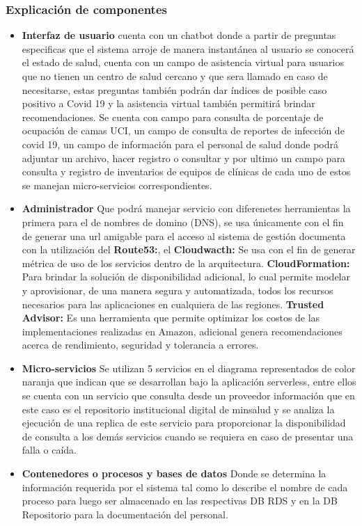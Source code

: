 \documentclass{article}
\begin{document}
\subsubsection{Explicación de componentes}

\begin{itemize}
    \item \textbf{Interfaz de usuario} cuenta con un chatbot donde a partir de preguntas especificas que el sistema arroje de manera instantánea al usuario se conocerá el estado de salud, cuenta con un campo de asistencia virtual para usuarios que no tienen un centro de salud cercano y que sera llamado en caso de necesitarse, estas preguntas también podrán dar índices de posible caso positivo a Covid 19 y la asistencia virtual también permitirá brindar recomendaciones. Se cuenta con campo para consulta de porcentaje de ocupación de camas UCI, un campo de consulta de reportes de infección  de covid 19, un campo de información para el personal de salud donde podrá adjuntar un archivo, hacer registro o consultar  y por ultimo un campo para consulta y registro de inventarios de equipos de clínicas de cada uno de estos se manejan micro-servicios correspondientes.
    
     \item \textbf{Administrador} Que podrá manejar servicio con diferenetes herramientas la primera para el de nombres de domino (DNS), se usa únicamente con el fin de generar una url amigable para el acceso al sistema de gestión documenta con la utilización del \textbf{Route53:}, el \textbf{Cloudwacth:} Se usa con el fin de generar métrica de uso de los servicios dentro de la arquitectura. \textbf{CloudFormation:} Para brindar la solución de disponibilidad adicional, lo cual permite modelar y aprovisionar, de una manera segura y automatizada, todos los recursos necesarios para las aplicaciones en cualquiera de las regiones. \textbf{Trusted Advisor:} Es una herramienta que permite optimizar los costos de las implementaciones realizadas en Amazon, adicional genera recomendaciones acerca de rendimiento, seguridad y tolerancia a errores.
     
    \item \textbf{Micro-servicios} Se utilizan 5 servicios en el diagrama representados de color naranja que indican que se desarrollan bajo la aplicación serverless, entre ellos se cuenta con un servicio que consulta desde un proveedor información que en este caso es el repositorio institucional digital de minsalud y se analiza la ejecución de una replica de este servicio para proporcionar la disponibilidad de consulta a los demás servicios cuando se requiera en caso de presentar una falla o caída.
    \item \textbf{Contenedores o procesos y bases de datos} Donde se determina la información requerida  por el sistema tal como lo describe el nombre de cada proceso para luego ser almacenado en las respectivas DB RDS y en la DB Repositorio para la documentación del personal.
    

\end{itemize}
\end{document}
